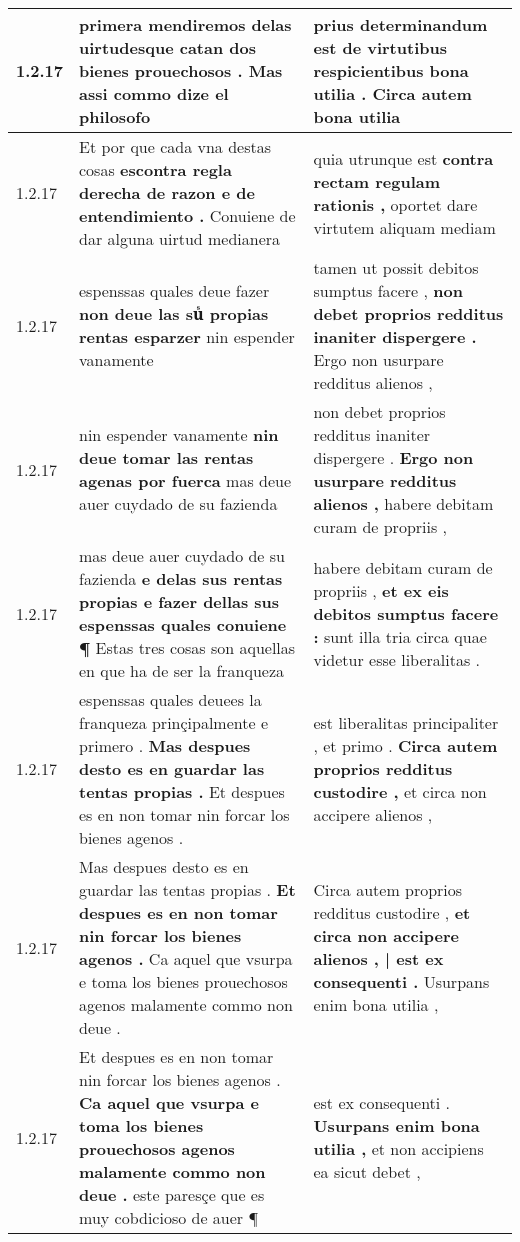 \begin{tabular}{|p{1cm}|p{6.5cm}|p{6.5cm}|}
1.2.17 & primera mendiremos delas \textbf{ uirtudesque catan dos bienes prouechosos . } Mas assi commo dize el philosofo & prius determinandum est \textbf{ de virtutibus respicientibus bona utilia . } Circa autem bona utilia \\\hline
1.2.17 & Et por que cada vna destas cosas \textbf{ escontra regla derecha de razon e de entendimiento . } Conuiene de dar alguna uirtud medianera & quia utrunque est \textbf{ contra rectam regulam rationis , } oportet dare virtutem aliquam mediam \\\hline
1.2.17 & espenssas quales deue fazer \textbf{ non deue las suᷤ propias rentas esparzer } nin espender vanamente & tamen ut possit debitos sumptus facere , \textbf{ non debet proprios redditus inaniter dispergere . } Ergo non usurpare redditus alienos , \\\hline
1.2.17 & nin espender vanamente \textbf{ nin deue tomar las rentas agenas por fuerca } mas deue auer cuydado de su fazienda & non debet proprios redditus inaniter dispergere . \textbf{ Ergo non usurpare redditus alienos , } habere debitam curam de propriis , \\\hline
1.2.17 & mas deue auer cuydado de su fazienda \textbf{ e delas sus rentas propias e fazer dellas sus espenssas quales conuiene ¶ } Estas tres cosas son aquellas en que ha de ser la franqueza & habere debitam curam de propriis , \textbf{ et ex eis debitos sumptus facere : } sunt illa tria circa quae videtur esse liberalitas . \\\hline
1.2.17 & espenssas quales deuees la franqueza prinçipalmente e primero . \textbf{ Mas despues desto es en guardar las tentas propias . } Et despues es en non tomar nin forcar los bienes agenos . & est liberalitas principaliter , et primo . \textbf{ Circa autem proprios redditus custodire , } et circa non accipere alienos , \\\hline
1.2.17 & Mas despues desto es en guardar las tentas propias . \textbf{ Et despues es en non tomar nin forcar los bienes agenos . } Ca aquel que vsurpa e toma los bienes prouechosos agenos malamente commo non deue . & Circa autem proprios redditus custodire , \textbf{ et circa non accipere alienos , | est ex consequenti . } Usurpans enim bona utilia , \\\hline
1.2.17 & Et despues es en non tomar nin forcar los bienes agenos . \textbf{ Ca aquel que vsurpa e toma los bienes prouechosos agenos malamente commo non deue . } este paresçe que es muy cobdicioso de auer ¶ & est ex consequenti . \textbf{ Usurpans enim bona utilia , } et non accipiens ea sicut debet , \\\hline

\end{tabular}
